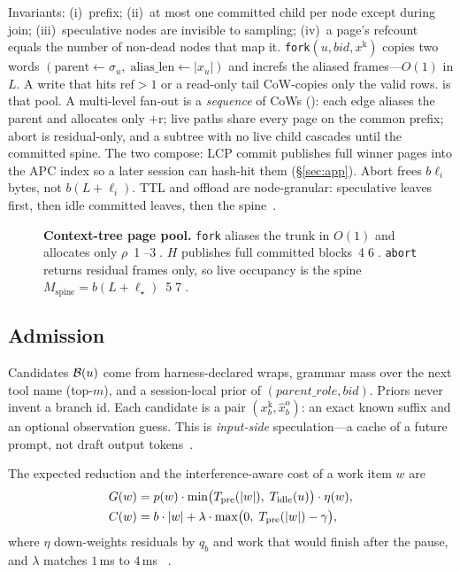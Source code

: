 Invariants: (i)~prefix; (ii)~at most one committed child per node except during join; (iii)~speculative nodes are invisible to sampling; (iv)~a page's refcount equals the number of non-dead nodes that map it.
\texttt{fork}$(u,\mathit{bid},x^{\mathrm{k}})$ copies two words $(\mathrm{parent}\leftarrow\sigma_u,\;\mathrm{alias\_len}\leftarrow|x_u|)$ and increfs the aliased frames---$O(1)$ in $L$.
A write that hits $\mathrm{ref}>1$ or a read-only tail CoW-copies only the valid rows.
 is that pool.
A multi-level fan-out is a \emph{sequence} of CoWs (): each edge aliases the parent and allocates only $+$r; live paths share every page on the common prefix; abort is residual-only, and a subtree with no live child cascades until the committed spine.
The two compose: LCP commit publishes full winner pages into the APC index so a later session can hash-hit them (\S\ref{sec:app}).
Abort frees $b\ell_i$ bytes, not $b(L+\ell_i)$.
TTL and offload are node-granular: speculative leaves first, then idle committed leaves, then the spine~\cite{continuum,mori}.

\begin{figure}[t]
\centering
\resizebox{\textwidth}{!}{}
\caption{\textbf{Context-tree page pool.}
\texttt{fork} aliases the trunk in $O(1)$ and allocates only $\rho$~\textcircled{1}--\textcircled{3}.
$H$ publishes full committed blocks~\textcircled{4}\textcircled{6}.
\texttt{abort} returns residual frames only, so live occupancy is the spine $M_{\mathrm{spine}}{=}b(L{+}\ell_\star)$~\textcircled{5}\textcircled{7}.}
\label{fig:pool}
\end{figure}

\subsection{Admission}
\label{sec:speculate}
Candidates $\mathcal{B}(u)$ come from harness-declared wraps, grammar mass over the next tool name (top-$m$), and a session-local prior of $(\mathit{parent\_role},\mathit{bid})$.
Priors never invent a branch id.
Each candidate is a pair $(x^{\mathrm{k}}_b,\hat{x}^{\mathrm{o}}_b)$: an exact known suffix and an optional observation guess.
This is \emph{input-side} speculation---a cache of a future prompt, not draft output tokens~\cite{speculative,medusa}.

The expected \ttft{} reduction and the interference-aware cost of a work item $w$ are
\begin{align}
G(w) &= p(w)\cdot\min\bigl(T_{\mathrm{pre}}(|w|),\;T_{\mathrm{idle}}(u)\bigr)\cdot\eta(w), \label{eq:gain}\\
C(w) &= b\cdot|w|+\lambda\cdot\max\bigl(0,\;T_{\mathrm{pre}}(|w|)-\gamma\bigr), \label{eq:cost}
\end{align}
where $\eta$ down-weights residuals by $q_b$ and work that would finish after the pause, and $\lambda$ matches $1$\,ms \tbt{} to $4$\,ms \ttft{}~\cite{jitserve}.

